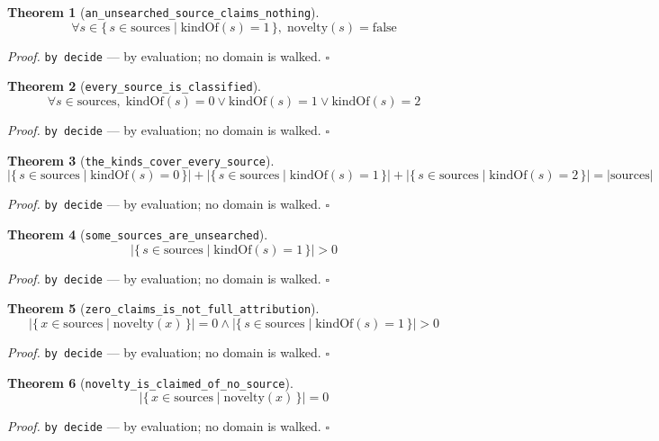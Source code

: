 \documentclass[11pt]{article}
\newtheorem{theorem}{Theorem}[section]
\begin{document}
\begin{theorem}[\texttt{an\_unsearched\_source\_claims\_nothing}]
\[ \forall s \in \{\, s \in \mathrm{sources} \mid \mathrm{kindOf}\mathopen{}\left(s\right) = 1 \,\},\; \mathrm{novelty}\mathopen{}\left(s\right) = \mathrm{false} \]
\end{theorem}
\noindent\emph{Proof.} \texttt{by decide} --- by evaluation; no domain is walked. \hfill$\square$

\begin{theorem}[\texttt{every\_source\_is\_classified}]
\[ \forall s \in \mathrm{sources},\; \mathrm{kindOf}\mathopen{}\left(s\right) = 0 \lor \mathrm{kindOf}\mathopen{}\left(s\right) = 1 \lor \mathrm{kindOf}\mathopen{}\left(s\right) = 2 \]
\end{theorem}
\noindent\emph{Proof.} \texttt{by decide} --- by evaluation; no domain is walked. \hfill$\square$

\begin{theorem}[\texttt{the\_kinds\_cover\_every\_source}]
\[ \left|\{\, s \in \mathrm{sources} \mid \mathrm{kindOf}\mathopen{}\left(s\right) = 0 \,\}\right| + \left|\{\, s \in \mathrm{sources} \mid \mathrm{kindOf}\mathopen{}\left(s\right) = 1 \,\}\right| + \left|\{\, s \in \mathrm{sources} \mid \mathrm{kindOf}\mathopen{}\left(s\right) = 2 \,\}\right| = \left|\mathrm{sources}\right| \]
\end{theorem}
\noindent\emph{Proof.} \texttt{by decide} --- by evaluation; no domain is walked. \hfill$\square$

\begin{theorem}[\texttt{some\_sources\_are\_unsearched}]
\[ \left|\{\, s \in \mathrm{sources} \mid \mathrm{kindOf}\mathopen{}\left(s\right) = 1 \,\}\right| > 0 \]
\end{theorem}
\noindent\emph{Proof.} \texttt{by decide} --- by evaluation; no domain is walked. \hfill$\square$

\begin{theorem}[\texttt{zero\_claims\_is\_not\_full\_attribution}]
\[ \left|\{\, x \in \mathrm{sources} \mid \mathrm{novelty}\mathopen{}\left(x\right) \,\}\right| = 0 \land \left|\{\, s \in \mathrm{sources} \mid \mathrm{kindOf}\mathopen{}\left(s\right) = 1 \,\}\right| > 0 \]
\end{theorem}
\noindent\emph{Proof.} \texttt{by decide} --- by evaluation; no domain is walked. \hfill$\square$

\begin{theorem}[\texttt{novelty\_is\_claimed\_of\_no\_source}]
\[ \left|\{\, x \in \mathrm{sources} \mid \mathrm{novelty}\mathopen{}\left(x\right) \,\}\right| = 0 \]
\end{theorem}
\noindent\emph{Proof.} \texttt{by decide} --- by evaluation; no domain is walked. \hfill$\square$
\end{document}
